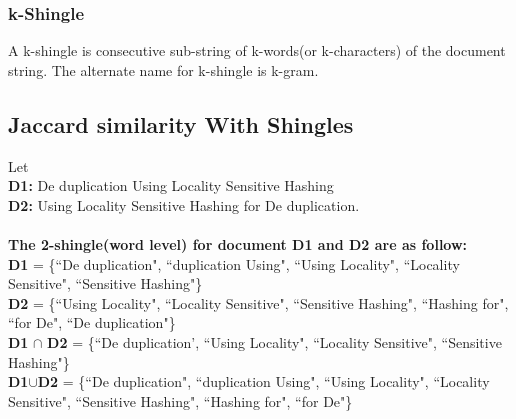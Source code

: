 \documentclass[12pt, a4paper,twoside]{article}
\begin{document}
\subsubsection*{k-Shingle}
A k-shingle is consecutive sub-string of k-words(or k-characters) of the document string. The alternate name for k-shingle is k-gram. \\
\subsection*{Jaccard similarity With Shingles} Let\\
\textbf{D1:} De duplication  Using Locality Sensitive Hashing\\
\textbf{D2:} Using Locality Sensitive Hashing for De duplication.\\ \\
\textbf{The 2-shingle(word level)  for document D1 and D2 are as follow:} \\
\textbf{D1} = \{``De duplication", ``duplication Using", ``Using Locality", ``Locality Sensitive", ``Sensitive Hashing"\} \\
\textbf{D2}  = \{``Using Locality", ``Locality Sensitive", ``Sensitive Hashing", ``Hashing for", ``for De", ``De duplication"\}\\
\textbf{D1} $\bm{\cap}$ \textbf{D2} = \{``De duplication', ``Using Locality", ``Locality Sensitive", ``Sensitive Hashing"\} \\
\textbf{D1}$\bm{\cup}$\textbf{D2} =  \{``De duplication", ``duplication Using", ``Using Locality", ``Locality Sensitive", ``Sensitive Hashing", ``Hashing for", ``for De"\} \\
\end{document}
